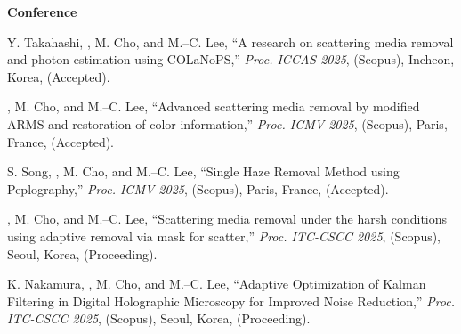 \documentclass[a4paper,9pt]{extarticle}
\begin{document}
\noindent
\textbf{Conference}
\begin{enumerate}[label={[\arabic*]}, start=1]
    \item 
    Y. Takahashi, , M. Cho, and M.--C. Lee, 
    ``A research on scattering media removal and photon estimation using COLaNoPS,''
    \textit{Proc. ICCAS 2025}, (Scopus),
    Incheon, Korea,
    (Accepted).

    \item 
    , M. Cho, and M.--C. Lee, 
    ``Advanced scattering media removal by modified ARMS and restoration of color information,'' 
    \textit{Proc. ICMV 2025}, (Scopus),
    Paris, France,
    (Accepted).
        
    \item 
    S. Song, , M. Cho, and M.--C. Lee, 
    ``Single Haze Removal Method using Peplography,'' 
    \textit{Proc. ICMV 2025}, (Scopus),
    Paris, France,
    (Accepted).

    \item 
    , M. Cho, and M.--C. Lee, 
    ``Scattering media removal under the harsh conditions using adaptive removal via mask for scatter,'' 
    \textit{Proc. ITC-CSCC 2025}, (Scopus),
    Seoul, Korea, 
    (Proceeding).
    
    \item 
    K. Nakamura, , M. Cho, and M.--C. Lee, 
    ``Adaptive Optimization of Kalman Filtering in Digital Holographic Microscopy for Improved Noise Reduction,'' 
    \textit{Proc. ITC-CSCC 2025}, (Scopus),
    Seoul, Korea, 
    (Proceeding).
    

\end{enumerate}
\end{document}
